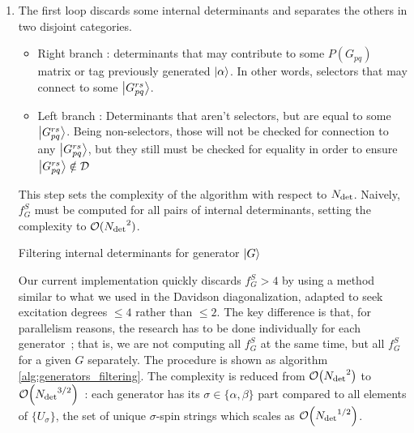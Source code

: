 \documentclass[./thesis.tex]{subfiles}
\begin{document}
\begin{enumerate}

\item
The first loop discards some internal determinants and separates the others in two disjoint categories.


\begin{itemize}
\item
Right branch : determinants that may contribute to some $P(G_{pq})$ matrix or tag previously generated $\ket \alpha$. In other words, selectors that may connect to some $\ket {G_{pq}^{rs}}$. 

\item
Left branch : Determinants that aren't selectors, but are equal to some $\ket {G_{pq}^{rs}}$. Being non-selectors, those will not be checked for connection to any $\ket {G_{pq}^{rs}}$, but they still must be checked for equality in order to ensure $\ket {G_{pq}^{rs}} \notin \mathcal{D}$
\end{itemize}


This step sets the complexity of the algorithm with respect to ${N_\text{det}}$. Naively, $f_G^S$ must be computed for all pairs of internal determinants, setting the complexity to $\mathcal{O}({N_\text{det}}^2)$.
\begin{algorithm}
\caption{Filtering internal determinants for generator $\ket G$}
\label{alg:generators_filtering}
\end{algorithm}
Our current implementation quickly discards $f_G^S > 4$ by using a method similar to what we used in the Davidson diagonalization, adapted to seek excitation degrees $\leq 4$ rather than $\leq 2$. The key difference is that, for parallelism reasons, the research has to be done individually for each generator~; that is, we are not computing all $f_G^S$ at the same time, but all $f_G^S$ for a given $G$ separately. The procedure is shown as algorithm \ref{alg:generators_filtering}. The complexity is reduced from $\order{\Ndet^2}$ to $\order{\Ndet^{3/2}}$~: each generator has its $\sigma \in \{\alpha, \beta\}$ part compared to all elements of $\{U_\sigma\}$,
the set of unique $\sigma$-spin strings which scales as $\order{\Ndet^{1/2}}$.





\end{enumerate}
\end{document}
